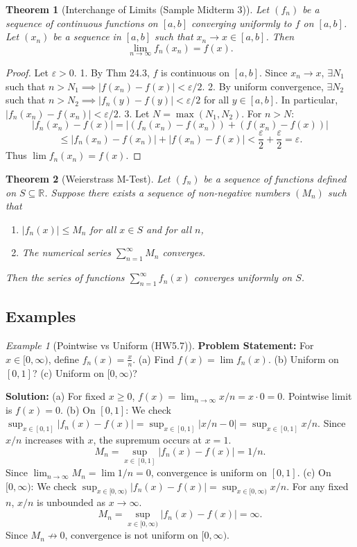 \documentclass{article}
\theoremstyle{definition}
\theoremstyle{plain}
\newtheorem{theorem}{Theorem}[section]
\theoremstyle{remark}
\newtheorem{example}{Example}[section]
\newcommand{\R}{\mathbb{R}}
\newcommand{\eps}{\varepsilon}
\begin{document}
\begin{theorem}[Interchange of Limits{\cite[Ex 24.17]{Ross}} (Sample Midterm 3)] \label{thm:limit_interchange}
Let \((f_n)\) be a sequence of continuous functions on \([a, b]\) converging uniformly to \(f\) on \([a, b]\). Let \((x_n)\) be a sequence in \([a, b]\) such that \(x_n \to x \in [a, b]\). Then
\[ \lim_{n\to\infty} f_n(x_n) = f(x). \]
\end{theorem}
\begin{proof}
Let \(\eps > 0\).
1. By Thm 24.3, \(f\) is continuous on \([a, b]\). Since \(x_n \to x\), \(\exists N_1\) such that \(n > N_1 \implies |f(x_n) - f(x)| < \eps/2\).
2. By uniform convergence, \(\exists N_2\) such that \(n > N_2 \implies |f_n(y) - f(y)| < \eps/2\) for all \(y \in [a, b]\). In particular, \(|f_n(x_n) - f(x_n)| < \eps/2\).
3. Let \(N = \max(N_1, N_2)\). For \(n > N\):
\[ |f_n(x_n) - f(x)| = |(f_n(x_n) - f(x_n)) + (f(x_n) - f(x))| \]
\[ \le |f_n(x_n) - f(x_n)| + |f(x_n) - f(x)| < \frac{\eps}{2} + \frac{\eps}{2} = \eps. \]
Thus \(\lim f_n(x_n) = f(x)\).
\end{proof}

\begin{theorem}[Weierstrass M-Test{\cite[Thm 25.7]{Ross}}]
Let \((f_n)\) be a sequence of functions defined on \(S \subseteq \R\). Suppose there exists a sequence of non-negative numbers \((M_n)\) such that
\begin{enumerate}
    \item \(|f_n(x)| \le M_n\) for all \(x \in S\) and for all \(n\),
    \item The numerical series \(\sum_{n=1}^\infty M_n\) converges.
\end{enumerate}
Then the series of functions \(\sum_{n=1}^\infty f_n(x)\) converges uniformly on \(S\).
\end{theorem}

\subsection{Examples}

\begin{example}[Pointwise vs Uniform (HW5.7)]
\textbf{Problem Statement:} For \(x\in [0,\infty)\), define \(f_n(x) = \tfrac{x}{n}\). (a) Find \(f(x) = \lim f_n(x)\). (b) Uniform on \([0,1]\)? (c) Uniform on \([0,\infty)\)?

\textbf{Solution:}
(a) For fixed \(x \ge 0\), \(f(x) = \lim_{n\to\infty} x/n = x \cdot 0 = 0\). Pointwise limit is \(f(x)=0\).
(b) On \([0,1]\): We check \(\sup_{x \in [0,1]} |f_n(x) - f(x)| = \sup_{x \in [0,1]} |x/n - 0| = \sup_{x \in [0,1]} x/n\). Since \(x/n\) increases with \(x\), the supremum occurs at \(x=1\).
\[ M_n = \sup_{x \in [0,1]} |f_n(x) - f(x)| = 1/n. \]
Since \(\lim_{n\to\infty} M_n = \lim 1/n = 0\), convergence is uniform on \([0,1]\).
(c) On \([0,\infty)\): We check \(\sup_{x \in [0,\infty)} |f_n(x) - f(x)| = \sup_{x \in [0,\infty)} x/n\). For any fixed \(n\), \(x/n\) is unbounded as \(x \to \infty\).
\[ M_n = \sup_{x \in [0,\infty)} |f_n(x) - f(x)| = \infty. \]
Since \(M_n \not\to 0\), convergence is not uniform on \([0,\infty)\).
\end{example}
\end{document}
